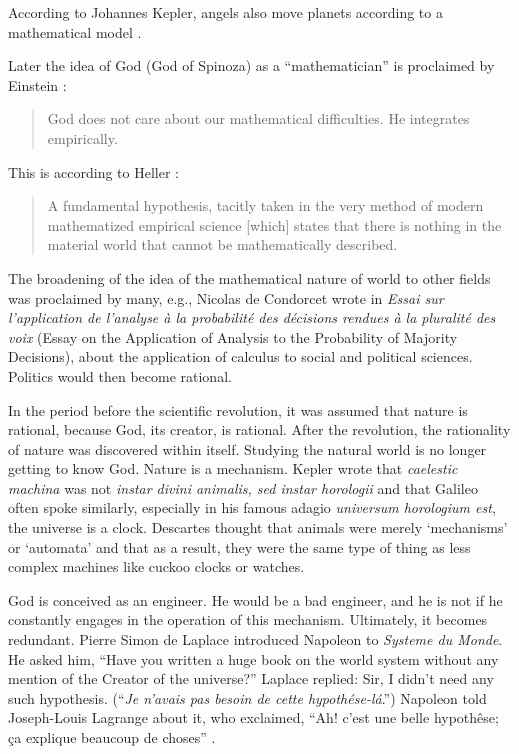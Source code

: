 \documentclass[pdftex,12pt]{article}
\begin{document}
According to Johannes Kepler, angels also move planets according to a mathematical model \parencite{Donahue1993,Wolfson1962}.

Later the idea of God (God of Spinoza) as a ``mathematician'' is proclaimed by Einstein \parencite[p.279]{Infeld1980}: \begin{quote} \small God does not care about our mathematical difficulties. He integrates empirically. \end{quote} This is according to Heller \parencite*[p.41]{Heller2014}: \begin{quote} \small A fundamental hypothesis, tacitly taken in the very method of modern mathematized empirical science [which] states that there is nothing in the material world that cannot be mathematically described. \end{quote}

The broadening of the idea of the mathematical nature of world to other fields was proclaimed by many, e.g., Nicolas de Condorcet   wrote in \emph{Essai sur l’application de l’analyse à la probabilité des décisions rendues à la pluralité des voix} \parencite*{Condorcet1785} (Essay on the Application of Analysis to the Probability of Majority Decisions),  about the application of calculus to social and political sciences. Politics would then become rational.


In the period before the scientific revolution, it was assumed that nature is rational, because God, its creator, is rational. After the revolution, the rationality of nature was discovered within itself. Studying the natural world is no longer getting to know God. Nature is a mechanism. Kepler wrote that \emph{caelestic machina} was not \emph{instar divini animalis, sed instar horologii} and that Galileo often spoke similarly, especially in his famous adagio \emph{universum horologium est}, the universe is a clock. Descartes thought that animals were merely ‘mechanisms’ or ‘automata’ and that as a result, they were the same type of thing as less complex machines like cuckoo clocks or watches.

God is conceived as an engineer. He would be a bad engineer, and he is not if he constantly engages in the operation of this mechanism. Ultimately, it becomes redundant. Pierre Simon de Laplace introduced Napoleon to \emph{Systeme du Monde}. He asked him, ``Have you written a huge book on the world system without any mention of the Creator of the universe?'' Laplace replied: Sir, I didn't need any such hypothesis. (``\textit{Je n'avais pas besoin de cette hypoth{\'e}se-l{\'a}}.'') Napoleon told Joseph-Louis Lagrange about it, who exclaimed, ``Ah! c'est une belle hypoth{\^e}se; \c{c}a explique beaucoup de choses'' \parencite[pp.249--250]{Morgan1872}.
\end{document}
